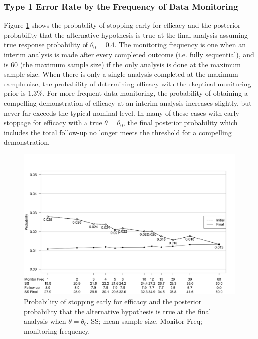 \documentclass[useAMS,usenatbib,referee]{biom}
\begin{document}
\subsubsection{Type 1 Error Rate by the Frequency of Data Monitoring}\label{sec:ex1t1e}
Figure \ref{fig:ex1t1e} shows the probability of stopping early for efficacy and the posterior probability that the alternative hypothesis is true at the final analysis assuming true response probability of $\theta_0=0.4$. 
%
The monitoring frequency is one when an interim analysis is made after every completed outcome (i.e. fully sequential), and is 60 (the maximum sample size) if the only analysis is done at the maximum sample size.
%
When there is only a single analysis completed at the maximum sample size, the probability of determining efficacy with the skeptical monitoring prior is $1.3\%$.
%
%
%
For more frequent data monitoring, the probability of obtaining a compelling demonstration of efficacy at an interim analysis increases slightly, but never far exceeds the typical nominal level. 
%
In many of these cases with early stoppage for efficacy with a true $\theta=\theta_0$, the final posterior probability which includes the total follow-up no longer meets the threshold for a compelling demonstration.
\begin{figure}\begin{center}

    \includegraphics[width=6in]{figure4.png}
    \caption{Probability of stopping early for efficacy and the posterior probability that the alternative hypothesis is true at the final analysis when $\theta=\theta_0$. SS; mean sample size. Monitor Freq; monitoring frequency.}
	\label{fig:ex1t1e}

 
\end{center}
\end{figure}
\end{document}
